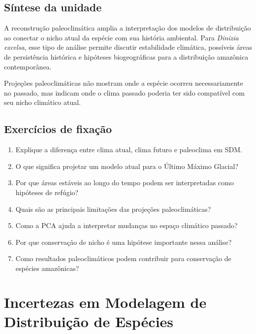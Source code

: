 \documentclass{ueap-sdm}
\begin{document}

\section{Síntese da unidade}

A reconstrução paleoclimática amplia a interpretação dos modelos de distribuição ao conectar o nicho atual da espécie com sua história ambiental. Para \textit{Dinizia excelsa}, esse tipo de análise permite discutir estabilidade climática, possíveis áreas de persistência histórica e hipóteses biogeográficas para a distribuição amazônica contemporânea.

\begin{conceito}[title={\faBook\quad Mensagem central}]
	Projeções paleoclimáticas não mostram onde a espécie ocorreu necessariamente no passado, mas indicam onde o clima passado poderia ter sido compatível com seu nicho climático atual.
\end{conceito}

\section{Exercícios de fixação}

\begin{enumerate}
	\item Explique a diferença entre clima atual, clima futuro e paleoclima em SDM.
	\item O que significa projetar um modelo atual para o Último Máximo Glacial?
	\item Por que áreas estáveis ao longo do tempo podem ser interpretadas como hipóteses de refúgio?
	\item Quais são as principais limitações das projeções paleoclimáticas?
	\item Como a PCA ajuda a interpretar mudanças no espaço climático passado?
	\item Por que conservação de nicho é uma hipótese importante nessa análise?
	\item Como resultados paleoclimáticos podem contribuir para conservação de espécies amazônicas?
\end{enumerate}


\chapter[Incertezas em SDM]{Incertezas em Modelagem de Distribuição de Espécies}
\end{document}
